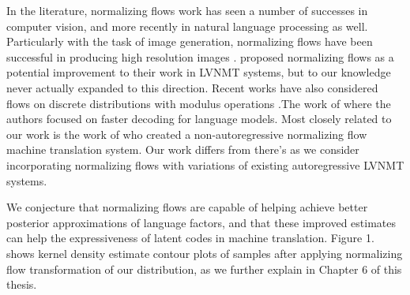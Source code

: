 In the literature, normalizing flows work has seen a number of successes in computer vision, and more recently in natural language processing as well. Particularly with the task of image generation, normalizing flows have been successful in producing high resolution images \cite{ kingma2016IAF, tomczak2016Householder,kingma2018GLOW, Berg2018SylvesterNF}. \citet{schulz2018StochasticDecoder} proposed normalizing flows as a potential improvement to their work in \ac{LVNMT} systems, but to our knowledge never actually expanded to this direction. Recent works have also considered flows on discrete distributions with modulus operations \cite{hoogeboom2019IntegerDiscreteFlows, tran2019discreteflows}.The work of \citet{ziegler2019LatentNFforDiscrete} where the authors focused on faster decoding for language models. Most closely related to our work is the work of \citet{flowseq2019Xuezhe} who created a  non-autoregressive normalizing flow machine translation system\cite{flowseq2019Xuezhe}.  Our work differs from there's as we consider incorporating normalizing flows with variations of existing autoregressive \ac{LVNMT} systems. 


We conjecture that normalizing flows are capable of helping achieve better posterior approximations of language factors, and that these improved estimates can help the expressiveness of latent codes in machine translation. Figure 1. shows kernel density estimate contour plots of samples after applying normalizing flow transformation
of our distribution, as we further explain in Chapter 6 of this thesis.


